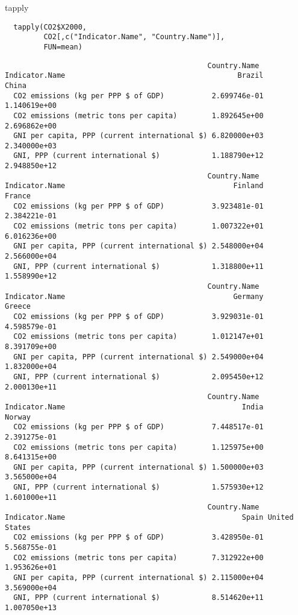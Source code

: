\documentclass[xcolor={usenames,svgnames,dvipsnames}]{beamer}
\begin{document}
\begin{frame}[fragile,label=sec-3-5]{tapply}
 \lstset{language=R,label= ,caption= ,numbers=none}
\begin{lstlisting}
  tapply(CO2$X2000,
         CO2[,c("Indicator.Name", "Country.Name")],
         FUN=mean)
\end{lstlisting}

\begin{verbatim}
                                               Country.Name
Indicator.Name                                        Brazil        China
  CO2 emissions (kg per PPP $ of GDP)           2.699746e-01 1.140619e+00
  CO2 emissions (metric tons per capita)        1.892645e+00 2.696862e+00
  GNI per capita, PPP (current international $) 6.820000e+03 2.340000e+03
  GNI, PPP (current international $)            1.188790e+12 2.948850e+12
                                               Country.Name
Indicator.Name                                       Finland       France
  CO2 emissions (kg per PPP $ of GDP)           3.923481e-01 2.384221e-01
  CO2 emissions (metric tons per capita)        1.007322e+01 6.016236e+00
  GNI per capita, PPP (current international $) 2.548000e+04 2.566000e+04
  GNI, PPP (current international $)            1.318800e+11 1.558990e+12
                                               Country.Name
Indicator.Name                                       Germany       Greece
  CO2 emissions (kg per PPP $ of GDP)           3.929031e-01 4.598579e-01
  CO2 emissions (metric tons per capita)        1.012147e+01 8.391709e+00
  GNI per capita, PPP (current international $) 2.549000e+04 1.832000e+04
  GNI, PPP (current international $)            2.095450e+12 2.000130e+11
                                               Country.Name
Indicator.Name                                         India       Norway
  CO2 emissions (kg per PPP $ of GDP)           7.448517e-01 2.391275e-01
  CO2 emissions (metric tons per capita)        1.125975e+00 8.641315e+00
  GNI per capita, PPP (current international $) 1.500000e+03 3.565000e+04
  GNI, PPP (current international $)            1.575930e+12 1.601000e+11
                                               Country.Name
Indicator.Name                                         Spain United States
  CO2 emissions (kg per PPP $ of GDP)           3.428950e-01  5.568755e-01
  CO2 emissions (metric tons per capita)        7.312922e+00  1.953626e+01
  GNI per capita, PPP (current international $) 2.115000e+04  3.569000e+04
  GNI, PPP (current international $)            8.514620e+11  1.007050e+13
\end{verbatim}
\end{frame}
\end{document}
